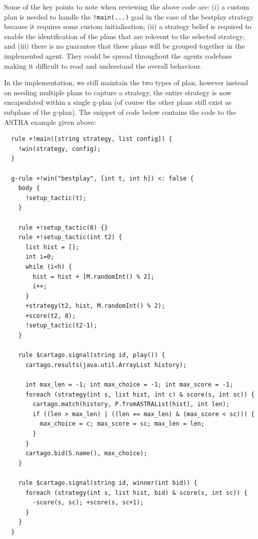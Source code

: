 Some of the key points to note when reviewing the above code are: (i) a custom plan is needed 
to handle the \verb|!main(...)| goal in the case of the bestplay strategy because it requires
some custom initialisation; (ii) a strategy belief is required to enable the identification of the
plans that are relevent to the selected strategy; and (iii) there is no guarantee that these
plans will be grouped together in the implemented agent. They could be spread throughout the
agents codebase making it difficult to read and understand the overall behaviour.

In the {\aser} implementation, we still maintain the two types of plan, however instead on needing
multiple plans to capture a strategy, the entire strategy is now encapsulated within a single
g-plan (of course the other plans still exist as subplans of the g-plan). The snippet of code 
below contains the {\aser} code to the ASTRA example given above:

{\small
\begin{verbatim}
  rule +!main([string strategy, list config]) {
    !win(strategy, config);
  }
  
  g-rule +!win("bestplay", [int t, int h]) <: false {
    body {
      !setup_tactic(t);
    }

    rule +!setup_tactic(0) {}
    rule +!setup_tactic(int t2) {
      list hist = [];
      int i=0;
      while (i<h) {
        hist = hist + [M.randomInt() % 2];
        i++;
      }
      +strategy(t2, hist, M.randomInt() % 2);
      +score(t2, 0);
      !setup_tactic(t2-1);
    }

    rule $cartago.signal(string id, play()) {
      cartago.results(java.util.ArrayList history);
			
      int max_len = -1; int max_choice = -1; int max_score = -1;
      foreach (strategy(int s, list hist, int c) & score(s, int sc)) {
        cartago.match(history, P.fromASTRAList(hist), int len);
        if ((len > max_len) | ((len == max_len) & (max_score < sc))) {
          max_choice = c; max_score = sc; max_len = len;
        }
      }		
      cartago.bid(S.name(), max_choice);
    }
		
    rule $cartago.signal(string id, winner(int bid)) {
      foreach (strategy(int s, list hist, bid) & score(s, int sc)) {
        -score(s, sc); +score(s, sc+1);
      }
    }
  }
\end{verbatim}}

